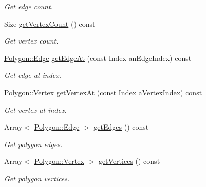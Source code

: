 \begin{DoxyCompactItemize}
\begin{DoxyCompactList}\small\item\em Get edge count. \end{DoxyCompactList}\item 
Size \hyperlink{classostk_1_1math_1_1geom_1_1d3_1_1objects_1_1_polygon_a5315dde32e364e81546c8bc4b62a9996}{get\+Vertex\+Count} () const
\begin{DoxyCompactList}\small\item\em Get vertex count. \end{DoxyCompactList}\item 
\hyperlink{classostk_1_1math_1_1geom_1_1d3_1_1objects_1_1_polygon_a58c9a7e93e903b2226804116cce4f1ec}{Polygon\+::\+Edge} \hyperlink{classostk_1_1math_1_1geom_1_1d3_1_1objects_1_1_polygon_a7ea6e4173c73e34e344d04e3fda71f44}{get\+Edge\+At} (const Index an\+Edge\+Index) const
\begin{DoxyCompactList}\small\item\em Get edge at index. \end{DoxyCompactList}\item 
\hyperlink{classostk_1_1math_1_1geom_1_1d3_1_1objects_1_1_polygon_a314eaf277355d59f5e6ab775702c47c2}{Polygon\+::\+Vertex} \hyperlink{classostk_1_1math_1_1geom_1_1d3_1_1objects_1_1_polygon_aa1d4c9b5847683b43e17711b4e2b3292}{get\+Vertex\+At} (const Index a\+Vertex\+Index) const
\begin{DoxyCompactList}\small\item\em Get vertex at index. \end{DoxyCompactList}\item 
Array$<$ \hyperlink{classostk_1_1math_1_1geom_1_1d3_1_1objects_1_1_polygon_a58c9a7e93e903b2226804116cce4f1ec}{Polygon\+::\+Edge} $>$ \hyperlink{classostk_1_1math_1_1geom_1_1d3_1_1objects_1_1_polygon_a2abe9ca5bd137591718a0b28834fe617}{get\+Edges} () const
\begin{DoxyCompactList}\small\item\em Get polygon edges. \end{DoxyCompactList}\item 
Array$<$ \hyperlink{classostk_1_1math_1_1geom_1_1d3_1_1objects_1_1_polygon_a314eaf277355d59f5e6ab775702c47c2}{Polygon\+::\+Vertex} $>$ \hyperlink{classostk_1_1math_1_1geom_1_1d3_1_1objects_1_1_polygon_ae5cb46e0bdcf9a9f59f03d05e2706301}{get\+Vertices} () const
\begin{DoxyCompactList}\small\item\em Get polygon vertices. \end{DoxyCompactList}\item 

\end{DoxyCompactItemize}
